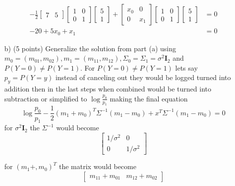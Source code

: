 \documentclass[a4 paper]{article}
\begin{document}
\begin{enumerate}
\begin{equation*}
\begin{split}
	 	-\frac{1}{2}\begin{bmatrix} 7 & 5 \end{bmatrix} \begin{bmatrix} 1 & 0 \\ 0 & 1\end{bmatrix}\begin{bmatrix} 5 \\ 1 \end{bmatrix} + \begin{bmatrix} x_0 & 0\\0 & x_1\end{bmatrix}\begin{bmatrix} 1 & 0 \\ 0 & 1\end{bmatrix}\begin{bmatrix} 5 \\ 1 \end{bmatrix} & = 0 \\
	 	-20 + 5x_0 + x_1 & =0
	\end{split}
	\end{equation*}
	
	\item[b)] (5 points) Generalize the solution from part (a) using $m_0 = (m_{01},m_{02}), m_1 = (m_{11}, m_{12}), \Sigma_0 = \Sigma_1 = \sigma^2\mathbf{I}_2$ and $P(Y=0) \neq P(Y=1)$. 
	For $P(Y=0) \neq P(Y=1)$ lets say $p_y = P(Y=y)$ instead of canceling out they would be logged turned into addition then in the last steps when combined would be turned into subtraction or simplified to $\log\frac{p_0}{p_1}$ making the final equation 
	\begin{equation*}
	\log{\frac{p_0}{p_1}}-\frac{1}{2}(m_1+m_0)^T\Sigma^{-1}(m_1-m_0) + x^T\Sigma^{-1}(m_1-m_0) = 0
	\end{equation*}
	for $\sigma^2\mathbf{I}_2$ the $\Sigma^{-1}$ would become
	\begin{equation*}
	\begin{bmatrix}
	1/\sigma^2 & 0 \\
	0 & 1/\sigma^2
	\end{bmatrix}
	\end{equation*}
	
	for $(m_1+,m_0)^T$ the matrix would become
	\begin{equation*}
	\begin{bmatrix}
	m_{11} + m_{01} & m_{12} + m_{02} 
	\end{bmatrix}
	\end{equation*}
	

\end{enumerate}
\end{document}
